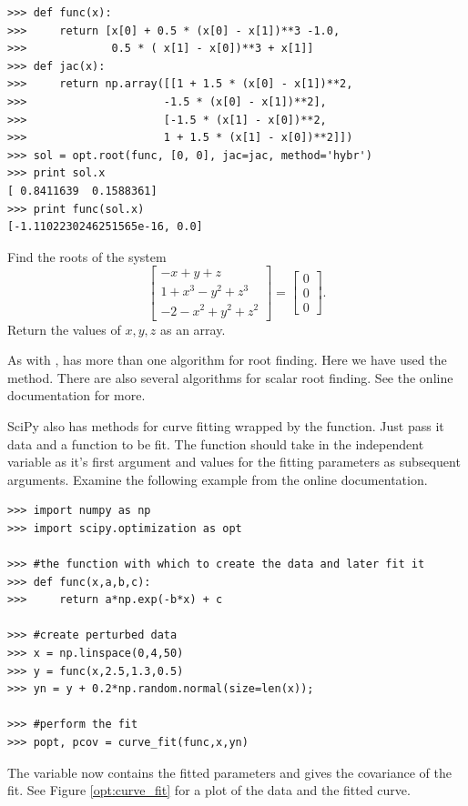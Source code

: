 \begin{lstlisting}
>>> def func(x):
>>>     return [x[0] + 0.5 * (x[0] - x[1])**3 -1.0,
>>>             0.5 * ( x[1] - x[0])**3 + x[1]]
>>> def jac(x):
>>>     return np.array([[1 + 1.5 * (x[0] - x[1])**2,
>>>                     -1.5 * (x[0] - x[1])**2],
>>>                     [-1.5 * (x[1] - x[0])**2,
>>>                     1 + 1.5 * (x[1] - x[0])**2]])
>>> sol = opt.root(func, [0, 0], jac=jac, method='hybr')
>>> print sol.x
[ 0.8411639  0.1588361]
>>> print func(sol.x)
[-1.1102230246251565e-16, 0.0]
\end{lstlisting}

\begin{problem}
Find the roots of the system
\[
\begin{bmatrix}
	-x+y+z \\
	1+x^3-y^2+z^3\\
	-2-x^2+y^2+z^2
\end{bmatrix} =
\begin{bmatrix}
	0 \\
	0 \\
	0
\end{bmatrix} .
\]
Return the values of $x,y,z$ as an array.
\end{problem}



As with ,  has more than one algorithm for root finding.
Here we have used the  method. There are also several algorithms for scalar root finding. See the online documentation for more.

SciPy also has methods for curve fitting wrapped by the  function.
Just pass it data and a function to be fit. The function should take in the independent variable as it's first argument and
values for the fitting parameters as subsequent arguments.
Examine the following example from the online documentation.
\begin{lstlisting}
>>> import numpy as np
>>> import scipy.optimization as opt

>>> #the function with which to create the data and later fit it
>>> def func(x,a,b,c):
>>>     return a*np.exp(-b*x) + c

>>> #create perturbed data
>>> x = np.linspace(0,4,50)
>>> y = func(x,2.5,1.3,0.5)
>>> yn = y + 0.2*np.random.normal(size=len(x));

>>> #perform the fit
>>> popt, pcov = curve_fit(func,x,yn)
\end{lstlisting}
The variable  now contains the fitted parameters and  gives the covariance of the fit.
See Figure \ref{opt:curve_fit} for a plot of the data and the fitted curve.

